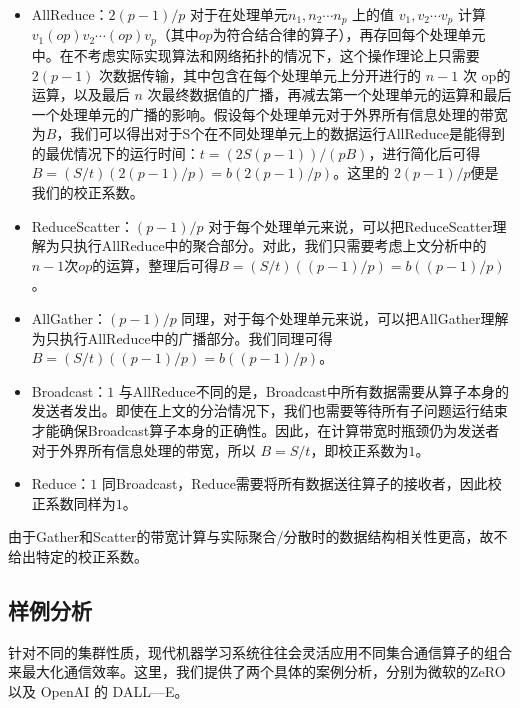 \documentclass[letterpaper,10pt,english]{sphinxmanual}
\begin{document}
\begin{itemize}
\item {} 
\sphinxAtStartPar
AllReduce：\(2(p-1)/p\)
对于在处理单元\(n_1, n_2 \cdots n_p\) 上的值
\(v_1, v_2 \cdots v_p\) 计算
\(v_1 (op) v_2 \cdots (op) v_p\)（其中\(op\)为符合结合律的算子），再存回每个处理单元中。在不考虑实际实现算法和网络拓扑的情况下，这个操作理论上只需要
\(2(p-1)\) 次数据传输，其中包含在每个处理单元上分开进行的
\(n-1\) 次 op的运算，以及最后 \(n\)
次最终数据值的广播，再减去第一个处理单元的运算和最后一个处理单元的广播的影响。假设每个处理单元对于外界所有信息处理的带宽为\(B\)，我们可以得出对于S个在不同处理单元上的数据运行AllReduce是能得到的最优情况下的运行时间：\(t = (2S(p-1)) / (pB)\)，进行简化后可得
\(B = (S/t)(2(p-1)/p) = b (2(p-1)/p)\)。这里的
\(2(p-1)/p\)便是我们的校正系数。

\item {} 
\sphinxAtStartPar
ReduceScatter：\((p-1)/p\)
对于每个处理单元来说，可以把ReduceScatter理解为只执行AllReduce中的聚合部分。对此，我们只需要考虑上文分析中的\(n-1\)次\(op\)的运算，整理后可得\(B = (S/t)((p-1)/p) = b ((p-1)/p)\)。

\item {} 
\sphinxAtStartPar
AllGather：\((p-1)/p\)
同理，对于每个处理单元来说，可以把AllGather理解为只执行AllReduce中的广播部分。我们同理可得\(B = (S/t)((p-1)/p) = b ((p-1)/p)\)。

\item {} 
\sphinxAtStartPar
Broadcast：\(1\)
与AllReduce不同的是，Broadcast中所有数据需要从算子本身的发送者发出。即使在上文的分治情况下，我们也需要等待所有子问题运行结束才能确保Broadcast算子本身的正确性。因此，在计算带宽时瓶颈仍为发送者对于外界所有信息处理的带宽，所以
\(B = S/t\)，即校正系数为\(1\)。

\item {} 
\sphinxAtStartPar
Reduce：\(1\)
同Broadcast，Reduce需要将所有数据送往算子的接收者，因此校正系数同样为\(1\)。

\end{itemize}

\sphinxAtStartPar
由于Gather和Scatter的带宽计算与实际聚合/分散时的数据结构相关性更高，故不给出特定的校正系数。


\subsection{样例分析}
\label{\detokenize{chapter_distributed_training/collective:id13}}
\sphinxAtStartPar
针对不同的集群性质，现代机器学习系统往往会灵活应用不同集合通信算子的组合来最大化通信效率。这里，我们提供了两个具体的案例分析，分别为微软的ZeRO
以及 OpenAI 的 DALL—E。
\end{document}
